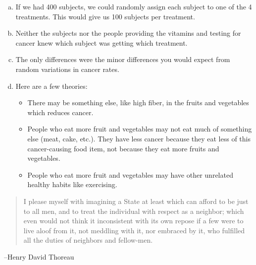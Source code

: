 \documentclass[letterpaper, landscape]{exam}
\begin{document}
\begin{description}
\begin{enumerate}[(a)]
          \item If we had 400 subjects, we could randomly assign each subject to
            one of the 4 treatments.  This would give us 100 subjects per
            treatment.

          \item Neither the subjects nor the people providing the vitamins and
            testing for cancer knew which subject was getting which treatment.

          \item The only differences were the minor differences you would expect
            from random variations in cancer rates.

          \item Here are a few theories:
            \begin{itemize}
              \item There may be something else, like high fiber, in the fruits
                and vegetables which reduces cancer.  

              \item People who eat more fruit and vegetables may not eat much of
                something else (meat, cake, etc.).  They have less cancer
                because they eat less of this cancer-causing food item, not
                because they eat more fruits and vegetables.

              \item People who eat more fruit and vegetables may have other
                unrelated healthy habits like exercising.

            \end{itemize}
        \end{enumerate}
  \end{description}

  \else
    \vspace{10 cm}
    \begin{quote}
      \begin{em}
        
        I please myself with imagining a State at least which can afford to be
        just to all men, and to treat the individual with respect as a neighbor;
        which even would not think it inconsistent with its own repose if a few
        were to live aloof from it, not meddling with it, nor embraced by it,
        who fulfilled all the duties of neighbors and fellow-men.
      \end{em}
    \end{quote}
    \hspace{1 cm} --Henry David Thoreau
  \fi
\end{document}
